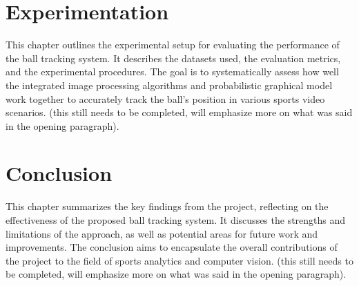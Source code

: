 \documentclass[12pt,a4paper]{article}
\begin{document}
\newpage
\section{Experimentation}
This chapter outlines the experimental setup for evaluating the performance of the ball tracking system. It describes the datasets used, the evaluation metrics, and the experimental procedures. The goal is to systematically assess how well the integrated image processing algorithms and probabilistic graphical model work together to accurately track the ball's position in various sports video scenarios. (this still needs to be completed, will emphasize more on what was said in the opening paragraph).

\newpage
\section{Conclusion}
This chapter summarizes the key findings from the project, reflecting on the effectiveness of the proposed ball tracking system. It discusses the strengths and limitations of the approach, as well as potential areas for future work and improvements. The conclusion aims to encapsulate the overall contributions of the project to the field of sports analytics and computer vision. (this still needs to be completed, will emphasize more on what was said in the opening paragraph).

\newpage
\printbibliography
\end{document}

